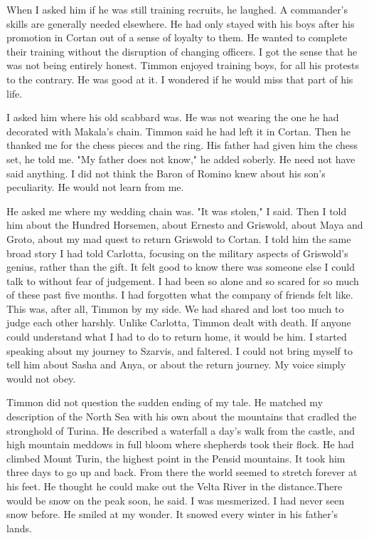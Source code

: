 \documentclass{article}
\begin{document}
When I asked him if he was still training recruits, he laughed. A commander's skills are generally needed elsewhere. He had only stayed with his boys after his promotion in Cortan out of a sense of loyalty to them. He wanted to complete their training without the disruption of changing officers. I got the sense that he was not being entirely honest. Timmon enjoyed training boys, for all his protests to the contrary. He was good at it. I wondered if he would miss that part of his life.

I asked him where his old scabbard was. He was not wearing the one he had decorated with Makala's chain. Timmon said he had left it in Cortan. Then he thanked me for the chess pieces and the ring. His father had given him the chess set, he told me. "My father does not know," he added soberly. He need not have said anything. I did not think the Baron of Romino knew about his son's peculiarity. He would not learn from me.

He asked me where my wedding chain was. "It was stolen," I said. Then I told him about the Hundred Horsemen, about Ernesto and Griswold, about Maya and Groto, about my mad quest to return Griswold to Cortan. I told him the same broad story I had told Carlotta, focusing on the military aspects of Griswold's genius, rather than the gift. It felt good to know there was someone else I could talk to without fear of judgement. I had been so alone and so scared for so much of these past five months. I had forgotten what the company of friends felt like. This was, after all, Timmon by my side. We had shared and lost too much to judge each other harshly. Unlike Carlotta, Timmon dealt with death. If anyone could understand what I had to do to return home, it would be him. I started speaking about my journey to Szarvis, and faltered. I could not bring myself to tell him about Sasha and Anya, or about the return journey. My voice simply would not obey. 

Timmon did not question the sudden ending of my tale. He matched my description of the North Sea with his own about the mountains that cradled the stronghold of Turina. He described a waterfall a day's walk from the castle, and high mountain meddows in full bloom where shepherds took their flock. He had climbed Mount Turin, the highest point in the Pensid mountains. It took him three days to go up and back. From there the world seemed to stretch forever at his feet. He thought he could make out the Velta River in the distance.There would be snow on the peak soon, he said. I was mesmerized. I had never seen snow before. He smiled at my wonder. It snowed every winter in his father's lands. 
\end{document}
